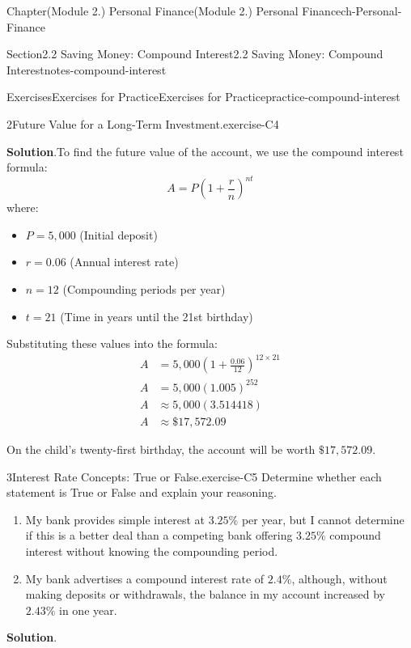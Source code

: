 \documentclass[oneside,10pt,]{book}
\newcommand{\blocktitlefont}{\relax}
\newcommand{\ptxlistdisc}{\raisebox{0.3ex}{\textbullet}}
\newcommand{\amp}{&}
\begin{document}
\begin{chapterptx}{Chapter}{(Module 2.) Personal Finance}{}{(Module 2.) Personal Finance}{}{}{ch-Personal-Finance}
\begin{sectionptx}{Section}{2.2 Saving Money: Compound Interest}{}{2.2 Saving Money: Compound Interest}{}{}{notes-compound-interest}
\begin{exercises-subsection-numberless}{Exercises}{Exercises for Practice}{}{Exercises for Practice}{}{}{practice-compound-interest}
\begin{divisionexercise}{2}{Future Value for a Long-Term Investment.}{}{exercise-C4}
\par\smallskip%
\noindent\textbf{\blocktitlefont Solution}.\hypertarget{exercise-C4-3}{}\quad{}To find the future value of the account, we use the compound interest formula:%
\begin{equation*}
A = P\left(1 + \frac{r}{n}\right)^{nt}
\end{equation*}
where:%
\begin{itemize}[label=\ptxlistdisc]
\item{}\(P = 5,000\) (Initial deposit)%
\item{}\(r = 0.06\) (Annual interest rate)%
\item{}\(n = 12\) (Compounding periods per year)%
\item{}\(t = 21\) (Time in years until the 21st birthday)%
\end{itemize}
%
\par
Substituting these values into the formula:%
\begin{align*}
A \amp = 5,000\left(1 + \frac{0.06}{12}\right)^{12 \times 21}\\
A \amp = 5,000(1.005)^{252}\\
A \amp \approx 5,000(3.514418)\\
A \amp \approx \$17,572.09
\end{align*}
%
\par
On the child's twenty-first birthday, the account will be worth \(\$17,572.09\).%
\end{divisionexercise}%
\begin{divisionexercise}{3}{Interest Rate Concepts: True or False.}{}{exercise-C5}%
Determine whether each statement is True or False and explain your reasoning.%
\begin{enumerate}[label={\arabic*}]
\item{}My bank provides simple interest at \(3.25\%\) per year, but I cannot determine if this is a better deal than a competing bank offering \(3.25\%\) compound interest without knowing the compounding period.%
\item{}My bank advertises a compound interest rate of \(2.4\%\), although, without making deposits or withdrawals, the balance in my account increased by \(2.43\%\) in one year.%
\end{enumerate}
%
\par\smallskip%
\noindent\textbf{\blocktitlefont Solution}.\hypertarget{exercise-C5-3}{}\quad{}%
\begin{enumerate}[label={\arabic*}]

\end{enumerate}
\end{divisionexercise}
\end{exercises-subsection-numberless}
\end{sectionptx}
\end{chapterptx}
\end{document}
